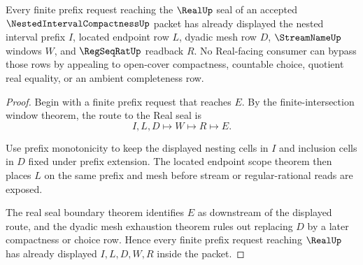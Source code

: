 \begin{theorem}
\label{thm:nested-interval-compactness-prefix-readback-coverage}
Every finite prefix request reaching the $\RealUp$ seal of an accepted $\NestedIntervalCompactnessUp$ packet has already displayed the nested interval prefix $I$, located endpoint row $L$, dyadic mesh row $D$, $\StreamNameUp$ windows $W$, and $\RegSeqRatUp$ readback $R$. No Real-facing consumer can bypass those rows by appealing to open-cover compactness, countable choice, quotient real equality, or an ambient completeness row.
\end{theorem}
\begin{proof}
Begin with a finite prefix request that reaches $E$. By the finite-intersection window theorem, the route to the Real seal is
$$
I,L,D \longmapsto W \longmapsto R \longmapsto E .
$$

Use prefix monotonicity to keep the displayed nesting cells in $I$ and inclusion cells in $D$ fixed under prefix extension. The located endpoint scope theorem then places $L$ on the same prefix and mesh before stream or regular-rational reads are exposed.

The real seal boundary theorem identifies $E$ as downstream of the displayed route, and the dyadic mesh exhaustion theorem rules out replacing $D$ by a later compactness or choice row. Hence every finite prefix request reaching $\RealUp$ has already displayed $I,L,D,W,R$ inside the packet.
\end{proof}

